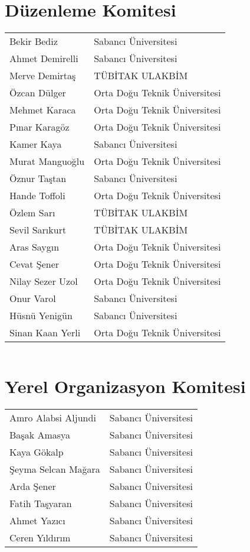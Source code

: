 \section{Düzenleme Komitesi}
\begin{center}
\begin{tabular}{ll}

Bekir Bediz & Sabancı Üniversitesi \\
Ahmet Demirelli & Sabancı Üniversitesi \\
Merve Demirtaş & TÜBİTAK ULAKBİM \\
Özcan Dülger & Orta Doğu Teknik Üniversitesi \\
Mehmet Karaca & Orta Doğu Teknik Üniversitesi \\
Pınar Karagöz & Orta Doğu Teknik Üniversitesi \\
Kamer Kaya & Sabancı Üniversitesi \\
Murat Manguoğlu & Orta Doğu Teknik Üniversitesi \\
Öznur Taştan & Sabancı Üniversitesi \\
Hande Toffoli & Orta Doğu Teknik Üniversitesi \\
Özlem Sarı & TÜBİTAK ULAKBİM \\
Sevil Sarıkurt & TÜBİTAK ULAKBİM \\
Aras Saygın & Orta Doğu Teknik Üniversitesi \\
Cevat Şener & Orta Doğu Teknik Üniversitesi \\ 
Nilay Sezer Uzol & Orta Doğu Teknik Üniversitesi \\
Onur Varol & Sabancı Üniversitesi \\
Hüsnü Yenigün & Sabancı Üniversitesi \\
Sinan Kaan Yerli & Orta Doğu Teknik Üniversitesi \\
\end{tabular}

\begin{tabular}{ll}

\end{tabular}
\end{center}

\section{Yerel Organizasyon Komitesi}
\begin{center}
\begin{tabular}{ll}
Amro Alabsi Aljundi & Sabancı Üniversitesi \\
Başak Amasya & Sabancı Üniversitesi \\
Kaya Gökalp & Sabancı Üniversitesi \\
Şeyma Selcan Mağara & Sabancı Üniversitesi \\
Arda Şener & Sabancı Üniversitesi \\
Fatih Taşyaran & Sabancı Üniversitesi \\
Ahmet Yazıcı & Sabancı Üniversitesi \\
Ceren Yıldırım & Sabancı Üniversitesi \\ 
\end{tabular}
\end{center}
